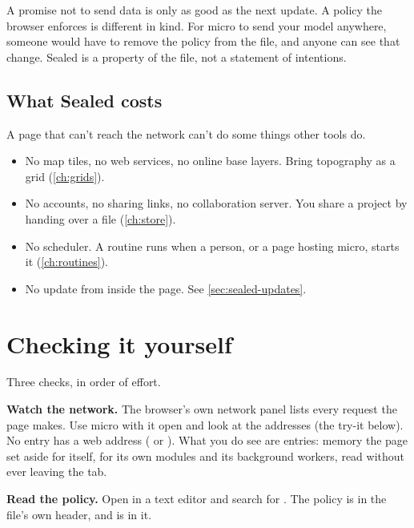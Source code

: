 
\begin{why}
A promise not to send data is only as good as the next update. A policy the browser enforces is different in kind. For micro to send your model anywhere, someone would have to remove the policy from the file, and anyone can see that change. Sealed is a property of the file, not a statement of intentions.
\end{why}

\subsection{What Sealed costs}
A page that can't reach the network can't do some things other tools do.

\begin{itemize}
\item No map tiles, no web services, no online base layers. Bring topography as a grid (\cref{ch:grids}).
\item No accounts, no sharing links, no collaboration server. You share a project by handing over a file (\cref{ch:store}).
\item No scheduler. A routine runs when a person, or a page hosting micro, starts it (\cref{ch:routines}).
\item No update from inside the page. See \cref{sec:sealed-updates}.
\end{itemize}

\section{Checking it yourself}\label{sec:sealed-verify}
Three checks, in order of effort.

\textbf{Watch the network.} The browser's own network panel lists every request the page makes. Use micro with it open and look at the addresses (the try-it below). No entry has a web address ( or ). What you do see are  entries: memory the page set aside for itself, for its own modules and its background workers, read without ever leaving the tab.

\textbf{Read the policy.} Open  in a text editor and search for . The policy is in the file's own header, and  is in it.

